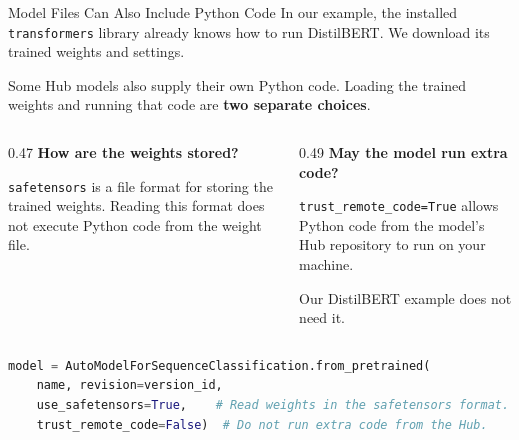 \documentclass[aspectratio=169]{beamer}
\begin{document}
\begin{frame}[fragile]{Model Files Can Also Include Python Code}
  \small In our example, the installed \texttt{transformers} library already knows how to run DistilBERT. We download its trained weights and settings.
  \par\vspace{0.4em}
  Some Hub models also supply their own Python code. Loading the trained weights and running that code are \textbf{two separate choices}.
  \par\vspace{0.5em}
  \begin{columns}[T,onlytextwidth]
    \begin{column}{0.47\linewidth}
      \textbf{How are the weights stored?}
      \par\vspace{0.3em}
      \texttt{safetensors} is a file format for storing the trained weights. Reading this format does not execute Python code from the weight file.
    \end{column}
    \begin{column}{0.49\linewidth}
      \textbf{May the model run extra code?}
      \par\vspace{0.3em}
      \texttt{trust\_remote\_code=True} allows Python code from the model's Hub repository to run on your machine.
      \par\vspace{0.3em}
      Our DistilBERT example does not need it.
    \end{column}
  \end{columns}
  \par\vspace{0.5em}
  \begin{lstlisting}[language=Python]
model = AutoModelForSequenceClassification.from_pretrained(
    name, revision=version_id,
    use_safetensors=True,    # Read weights in the safetensors format.
    trust_remote_code=False)  # Do not run extra code from the Hub.
  \end{lstlisting}
\end{frame}
\end{document}
